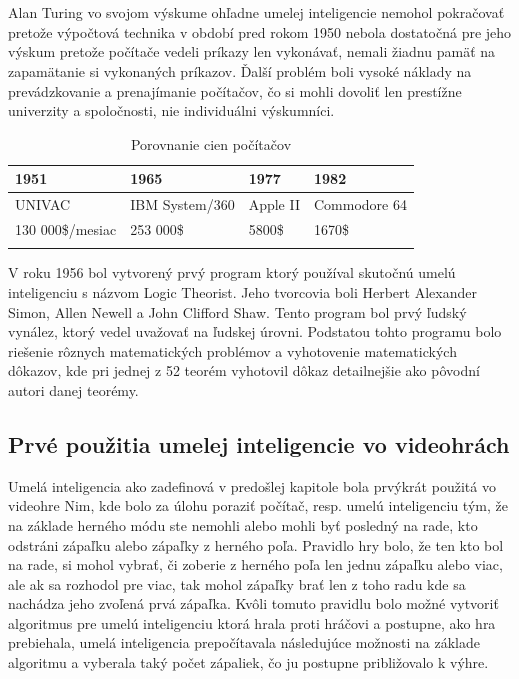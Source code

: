 \documentclass[10pt,oneside,slovak,a4paper]{article}
\begin{document}
\\\\
Alan Turing vo svojom výskume ohľadne umelej inteligencie nemohol pokračovať pretože výpočtová technika v období pred rokom 1950 nebola dostatočná pre jeho výskum pretože počítače vedeli príkazy len vykonávať, nemali žiadnu pamäť na zapamätanie si vykonaných príkazov. Ďalší problém boli vysoké náklady na prevádzkovanie a prenajímanie počítačov, čo si mohli dovoliť len prestížne univerzity a spoločnosti, nie individuálni výskumníci.\cite{HAI}
\begin{table}[tbh]
	\centering
	\caption{Porovnanie cien počítačov}
	\begin{tabular}{p{1.2in} p{1.3in} p{0.7in} p{1.1in}}
		1951 & 1965 & 1977 & 1982\\ \hline
		UNIVAC & IBM System/360 & Apple II & Commodore 64\\
		130 000\$/mesiac & 253 000\$ & 5800\$ & 1670\$\\
	\label{tab:cenyPC}
	\end{tabular}
\end{table}

V roku 1956 bol vytvorený prvý program ktorý používal skutočnú umelú inteligenciu s názvom Logic Theorist. Jeho tvorcovia boli Herbert Alexander Simon, Allen Newell a John Clifford Shaw. Tento program bol prvý ľudský vynález, ktorý vedel uvažovať na ľudskej úrovni. Podstatou tohto programu bolo riešenie rôznych matematických problémov a vyhotovenie matematických dôkazov, kde pri jednej z 52 teorém vyhotovil dôkaz detailnejšie ako pôvodní autori danej teorémy.      

\subsection{Prvé použitia umelej inteligencie vo videohrách} \label{kapitola2.1}
Umelá inteligencia ako zadefinová v predošlej kapitole bola prvýkrát použitá vo videohre Nim, kde bolo za úlohu poraziť počítač, resp. umelú inteligenciu tým, že na základe herného módu ste nemohli alebo mohli byť posledný na rade, kto odstráni zápaľku alebo zápaľky z herného poľa. Pravidlo hry bolo, že ten kto bol na rade, si mohol vybrať, či zoberie z herného poľa len jednu zápaľku alebo viac, ale ak sa rozhodol pre viac, tak mohol zápaľky brať len z toho radu kde sa nachádza jeho zvoľená prvá zápaľka. Kvôli tomuto pravidlu bolo možné vytvoriť algoritmus pre umelú inteligenciu ktorá hrala proti hráčovi a postupne, ako hra prebiehala, umelá inteligencia prepočítavala následujúce možnosti na základe algoritmu a vyberala taký počet zápaliek, čo ju postupne približovalo k výhre.
\end{document}

